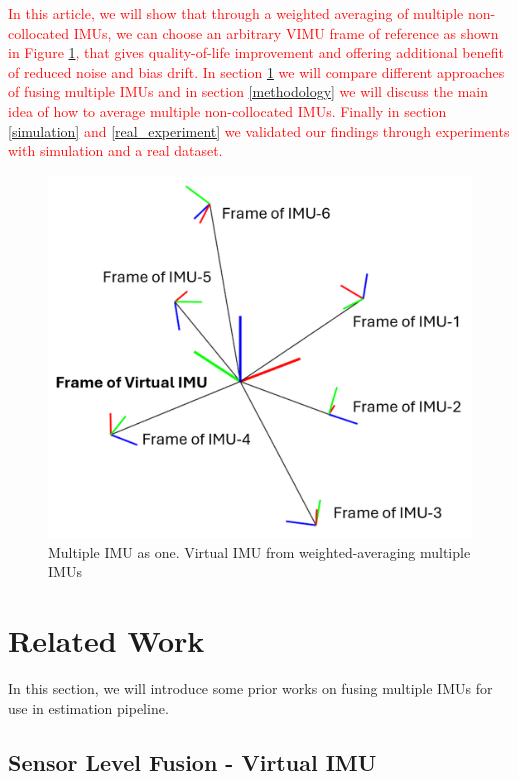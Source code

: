 \documentclass[conference]{IEEEtran}
\begin{document}
\textcolor{red}{In this article, we will show that through a weighted averaging of multiple non-collocated IMUs, we can choose an arbitrary VIMU frame of reference as shown in Figure \ref{fig:vimu_frame}, that gives quality-of-life improvement and offering additional benefit of reduced noise and bias drift. In section \ref{related_work} we will compare different approaches of fusing multiple IMUs and in section \ref{methodology} we will discuss the main idea of how to average multiple non-collocated IMUs. Finally in section \ref{simulation} and \ref{real_experiment} we validated our findings through experiments with simulation and a real dataset.}



\begin{figure}
    \centering
    \includegraphics[width=0.7\linewidth]{figures/fig_frame.png}
    \caption{Multiple IMU as one. Virtual IMU from weighted-averaging multiple IMUs}
    \label{fig:vimu_frame}
\end{figure}

\section{Related Work}\label{related_work}

In this section, we will introduce some prior works on fusing multiple IMUs for use in estimation pipeline.


\subsection{Sensor Level Fusion - Virtual IMU}\label{VIMU}
\end{document}
